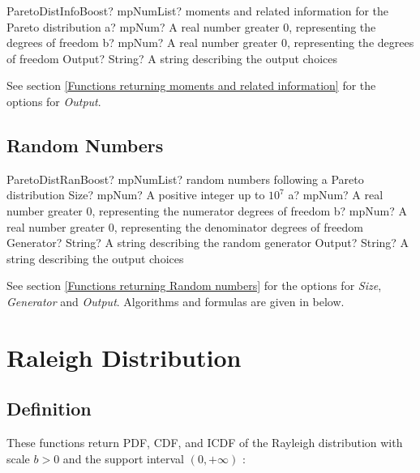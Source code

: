 \begin{mpFunctionsExtract}
	\mpFunctionThreeNotImplemented
	{ParetoDistInfoBoost? mpNumList? moments and related information for the Pareto distribution}
	{a? mpNum? A real number greater 0, representing the degrees of freedom}
	{b? mpNum? A real number greater 0, representing the degrees of freedom}
	{Output? String? A string describing the output choices}
\end{mpFunctionsExtract}

\vspace{0.3cm}

See section \ref{Functions returning moments and related information} for the options for {\itshape\sffamily Output}. 



\subsection{Random Numbers}

\begin{mpFunctionsExtract}
	\mpFunctionFiveNotImplemented
	{ParetoDistRanBoost? mpNumList? random numbers following a Pareto distribution}
	{Size? mpNum? A positive integer up to $10^7$}
	{a? mpNum? A real number greater 0, representing the numerator  degrees of freedom}
	{b? mpNum? A real number greater 0, representing the denominator degrees of freedom}
	{Generator? String? A string describing the random generator}
	{Output? String? A string describing the output choices}
\end{mpFunctionsExtract}

\vspace{0.3cm}

See section \ref{Functions returning Random numbers} for the options for  {\itshape\sffamily Size},  {\itshape\sffamily Generator} and {\itshape\sffamily Output}. Algorithms and formulas are given in below.




\newpage
\section{Raleigh Distribution}
\label{RaleighDistribution}

\subsection{Definition}
These functions return PDF, CDF, and ICDF of the Rayleigh distribution with scale
$b > 0$ and the support interval $(0,+\infty)$ :


